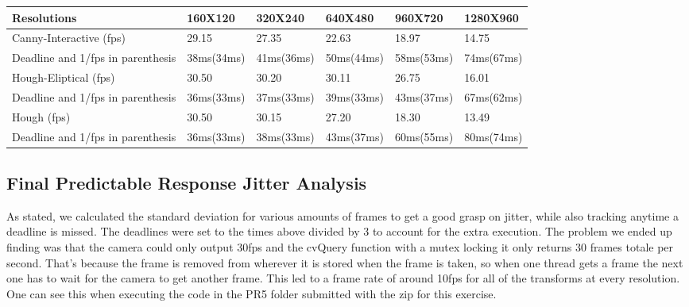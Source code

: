 \documentclass{article}
\begin{document}
\begin{table}[H]
    \centering
    \begin{tabular}{|l|l|l|l|l|l|}\hline
        Resolutions &160X120 &320X240 & 640X480& 960X720& 1280X960\\\hline
        Canny-Interactive (fps)&29.15 & 27.35 &22.63& 18.97 & 14.75 \\\hline
        Deadline and 1/fps in parenthesis & 38ms(34ms) & 41ms(36ms) & 50ms(44ms) & 58ms(53ms) & 74ms(67ms)\\\hline
        Hough-Eliptical (fps)&30.50 &30.20 &30.11 &26.75 &16.01\\\hline
        Deadline and 1/fps in parenthesis & 36ms(33ms) & 37ms(33ms) & 39ms(33ms)& 43ms(37ms) & 67ms(62ms)\\\hline
        Hough (fps)&30.50 &30.15 &27.20 &18.30 &13.49\\\hline
        Deadline and 1/fps in parenthesis & 36ms(33ms) & 38ms(33ms) & 43ms(37ms)& 60ms(55ms) & 80ms(74ms)\\\hline
    \end{tabular}
\end{table}

\subsection*{Final Predictable Response Jitter Analysis}
As stated, we calculated the standard deviation for various amounts of frames to get a good grasp on jitter, while also tracking anytime a deadline is missed. The deadlines were set to the times above divided by 3 to account for the extra execution. The problem we ended up finding was that the camera could only output 30fps and the cvQuery function with a mutex locking it only returns 30 frames totale per second. That's because the frame is removed from wherever it is stored when the
frame is taken, so when one thread gets a frame the next one has to wait for the camera to get another frame. This led to a frame rate of around 10fps for all of the transforms at every resolution. One can see this when executing the code in the PR5 folder submitted with the zip for this exercise. 
\end{document}
